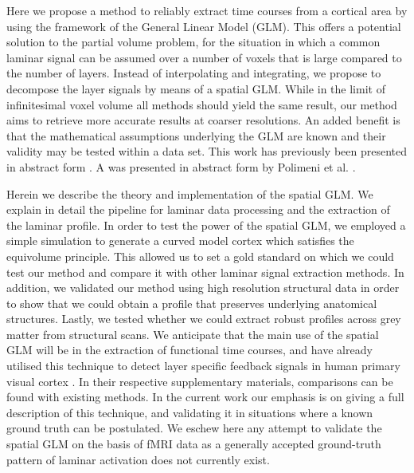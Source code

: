 Here we propose a method to reliably extract time courses from a cortical area by using the framework of the General Linear Model (GLM). This offers a potential solution to the partial volume problem, for the situation in which a common laminar signal can be assumed over a number of voxels that is large compared to the number of layers. Instead of interpolating and integrating, we propose to decompose the layer signals by means of a spatial GLM. While in the limit of infinitesimal voxel volume all methods should yield the same result, our method aims to retrieve more accurate results at coarser resolutions. An added benefit is that the mathematical assumptions underlying the GLM are known and their validity may be tested within a data set. This work has previously been presented in abstract form \cite{VanMourikISMRM2015}. A  was presented in abstract form by Polimeni et al. \cite{PolimeniISMRM2010}.
 
Herein we describe the theory and implementation of the spatial GLM. We explain in detail the pipeline for laminar data processing and the extraction of the laminar profile. In order to test the power of the spatial GLM, we employed a simple simulation to generate a curved model cortex which satisfies the equivolume principle. This allowed us to set a gold standard on which we could test our method and compare it with other laminar signal extraction methods. In addition, we validated our method using high resolution structural data in order to show that we could obtain a profile that preserves underlying anatomical structures. Lastly, we tested whether we could extract robust profiles across grey matter from structural scans. We anticipate that the main use of the spatial GLM will be in the extraction of functional time courses, and have already utilised this technique to detect layer specific feedback signals in human primary visual cortex \cite{Kok2016,VanMourik2018a}. In their respective supplementary materials, comparisons can be found with existing methods. In the current work our emphasis is on giving a full description of this technique, and validating it in situations where a known ground truth can be postulated. We eschew here any attempt to validate the spatial GLM on the basis of fMRI data as a generally accepted ground-truth pattern of laminar activation does not currently exist.



